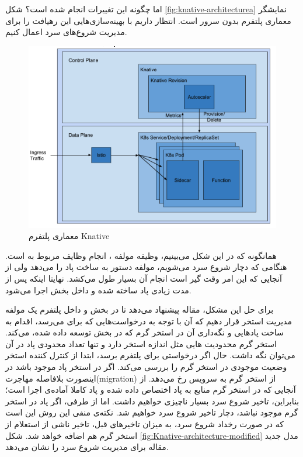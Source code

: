 اما چگونه این تغییرات انجام شده است؟ شکل \ref{fig:knative-architecturea} نمایشگر معماری پلتفرم بدون سرور  است. انتظار داریم با بهینه‌سازی‌هایی این رهیافت را برای مدیریت شروع‌های سرد اعمال کنیم. 

\begin{figure}
	\centering
	\includegraphics[width=\linewidth]{figs/knative-architecture}
	\caption {معماری پلتفرم Knative}
	\label{fig:knative-architecture}
\end{figure}

همانگونه که در این شکل می‌بینیم، وظیفه مولفه ،  انجام وظایف مربوط به  است. هنگامی که دچار شروع سرد می‌شویم، مولفه  دستور به ساخت پاد را می‌دهد  ولی از آنجایی که این امر وقت گیر است انجام آن بسیار طول می‌کشد. نهایتا اینکه پس از مدت زیادی پاد ساخته شده و داخل بخش  اجرا می‌شود.

برای حل این مشکل، مقاله پیشنهاد می‌دهد تا در بخش  و داخل  پلتفرم  یک مولفه مدیریت استخر قرار دهیم که آن با توجه به درخواست‌هایی که برای  می‌رسد، اقدام به ساخت پاد‌هایی و نگه‌داری آن در استخر گرم که در بخش  توسعه داده شده، می‌کند. استخر گرم محدودیت ‌هایی مثل اندازه استخر دارد و تنها تعداد محدودی پاد در آن می‌توان نگه داشت.  حال اگر درخواستی برای پلتفرم برسد،  ابتدا از کنترل کننده استخر وضعیت موجودی در استخر گرم را بررسی می‌کند. اگر در استخر پاد موجود باشد در اینصورت بلافاصله مهاجرت(migration)  از استخر گرم به سرویس رخ می‌دهد. از آنجایی که در استخر گرم منابع به پاد اختصاص داده شده و پاد کاملا آماده‌ی اجرا است؛ بنابراین، تاخیر شروع سرد بسیار ناچیزی خواهیم داشت. اما از طرفی، اگر پاد در استخر گرم موجود نباشد، دچار تاخیر شروع سرد خواهیم شد. نکته‌ی منفی این روش این است که در صورت رخداد شروع سرد، به میزان تاخیر‌های قبل، تاخیر ناشی از استعلام از استخر گرم ‌هم اضافه خواهد شد. شکل \ref{fig:Knative-architecture-modified} مدل جدید مقاله برای مدیریت شروع سرد را نشان می‌دهد. \cite{KubernetesInAction} 


